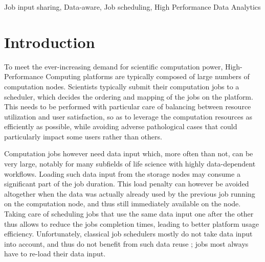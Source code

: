 \documentclass[conference,10pt]{IEEEtran}
\begin{document}
\begin{abstract}
  
  

  
\end{abstract}


\begin{IEEEkeywords}
Job input sharing,
Data-aware,
Job scheduling,
High Performance Data Analytics
\end{IEEEkeywords}

\section{Introduction}\label{sec.introduction}

To meet the ever-increasing demand for scientific computation power,
High-Performance Computing platforms are typically composed of large
numbers of computation nodes. Scientists typically submit their
computation jobs to a scheduler, which decides the ordering and mapping
of the jobs on the platform. This needs to be performed with particular
care of balancing between resource utilization and user satisfaction, so
as to leverage the computation resources as efficiently as possible,
while avoiding adverse pathological cases that could particularly impact
some users rather than others.

Computation jobs however need data input which, more often than not, can
be very large, notably for many subfields of life science with highly
data-dependent workflows. Loading such data input from the storage
nodes may consume a significant part of the job duration. This load
penalty can however be avoided altogether when the data was actually
already used by the previous job running on the computation node, and
thus still immediately available on the node. Taking care of scheduling
jobs that use the same data input one after the other thus allows to
reduce the jobs completion times, leading to better platform usage
efficiency. Unfortunately, classical job schedulers mostly do not take
data input into account, and thus do not benefit from such data reuse ;
jobs most always have to re-load their data input.
\end{document}
